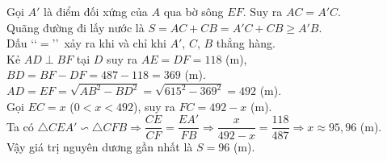 \begin{ex}
{	Gọi $A'$ là điểm đối xứng của $A$ qua bờ sông $EF$. Suy ra $AC=A'C$.\\
	Quãng đường đi lấy nước là $S=AC+CB=A'C+CB\geqslant A'B$.\\
	Dấu \lq\lq$=$\rq\rq\ xảy ra khi và chỉ khi $A'$, $C$, $B$ thẳng hàng.\\
	Kẻ $AD\perp BF$ tại $D$ suy ra $AE=DF=118$ (m), $BD=BF-DF=487-118=369$ (m). $AD=EF=\sqrt{AB^2-BD^2}=\sqrt{615^2-369^2}=492$ (m).\\
	Gọi $EC=x$ ($0<x<492$), suy ra $FC=492-x$ (m).\\
	Ta có $\triangle CEA'\backsim \triangle CFB\Rightarrow \dfrac{CE}{CF}=\dfrac{EA'}{FB}\Rightarrow\dfrac{x}{492-x}=\dfrac{118}{487}\Rightarrow x\approx 95{,}96$ (m).\\
	Vậy giá trị nguyên dương gần nhất là $S=96$ (m).
}
\end{ex}

